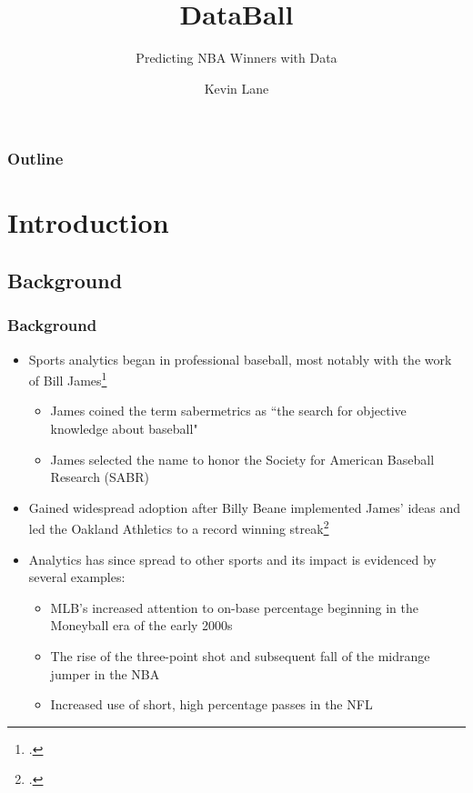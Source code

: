 \documentclass{beamer}
\title{DataBall}
\subtitle{Predicting NBA Winners with Data}
\author{Kevin Lane}
\begin{document}
\begin{frame}
\titlepage
\end{frame}

\begin{frame}
\frametitle{Outline}
\tableofcontents
\end{frame}

\section{Introduction}

\subsection{Background}
\begin{frame}
\frametitle{Background}
\begin{itemize}
    \item Sports analytics began in professional baseball, most notably with the work of Bill James\footcite{james}
    \begin{itemize}
        \item James coined the term sabermetrics as ``the search for objective knowledge about baseball"
        \item James selected the name to honor the Society for American Baseball Research (SABR)
    \end{itemize}
    \item Gained widespread adoption after Billy Beane implemented James' ideas and led the Oakland Athletics to a record winning streak\footcite{lewis}
    \item Analytics has since spread to other sports and its impact is evidenced by several examples:
    \begin{itemize}
        \item MLB's increased attention to on-base percentage beginning in the Moneyball era of the early 2000s
        \item The rise of the three-point shot and subsequent fall of the midrange jumper in the NBA
        \item Increased use of short, high percentage passes in the NFL
    \end{itemize}
\end{itemize}
\end{frame}
\end{document}
